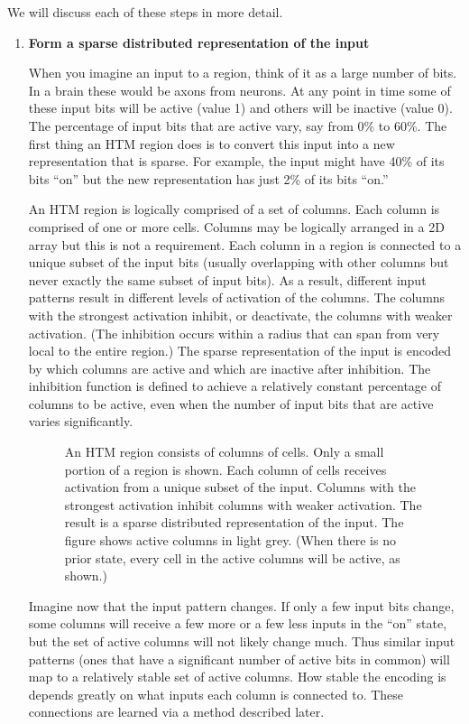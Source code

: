\documentclass{report}
\begin{document}
We will discuss each of these steps in more detail.

\begin{enumerate}
\item {\bf Form a sparse distributed representation of the input}

When you imagine an input to a region, think of it as a large number
of bits. In a brain these would be axons from neurons. At any point in
time some of these input bits will be active (value 1) and others will
be inactive (value 0). The percentage of input bits that are active
vary, say from 0\% to 60\%. The first thing an HTM region does is to
convert this input into a new representation that is sparse. For
example, the input might have 40\% of its bits ``on'' but the new
representation has just 2\% of its bits ``on.''

An HTM region is logically comprised of a set of columns. Each column
is comprised of one or more cells. Columns may be logically arranged
in a 2D array but this is not a requirement. Each column in a region
is connected to a unique subset of the input bits (usually overlapping
with other columns but never exactly the same subset of input
bits). As a result, different input patterns result in different
levels of activation of the columns. The columns with the strongest
activation inhibit, or deactivate, the columns with weaker
activation. (The inhibition occurs within a radius that can span from
very local to the entire region.) The sparse representation of the
input is encoded by which columns are active and which are inactive
after inhibition. The inhibition function is defined to achieve a
relatively constant percentage of columns to be active, even when the
number of input bits that are active varies significantly.

\begin{figure}
\caption{An HTM region consists of columns of cells. Only a small
  portion of a region is shown. Each column of cells receives
  activation from a unique subset of the input. Columns with the
  strongest activation inhibit columns with weaker activation. The
  result is a sparse distributed representation of the input. The
  figure shows active columns in light grey. (When there is no prior
  state, every cell in the active columns will be active, as shown.)}
\label{figure:region-columns}
\end{figure}

Imagine now that the input pattern changes. If only a few input bits
change, some columns will receive a few more or a few less inputs in
the ``on'' state, but the set of active columns will not likely change
much. Thus similar input patterns (ones that have a significant number
of active bits in common) will map to a relatively stable set of
active columns. How stable the encoding is depends greatly on what
inputs each column is connected to. These connections are learned via
a method described later.


\end{enumerate}
\end{document}
